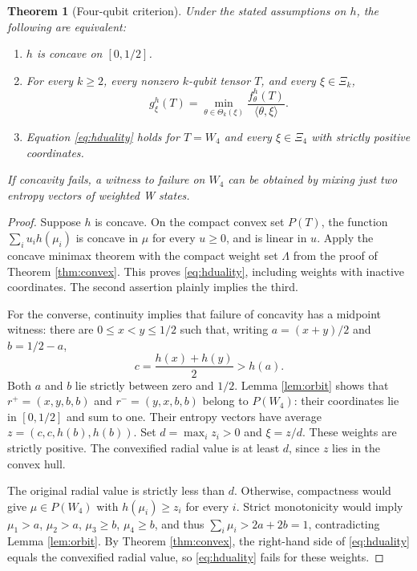 \documentclass[11pt,a4paper]{article}
\newtheorem{theorem}{Theorem}
\begin{document}
\begin{theorem}[Four-qubit criterion]\label{thm:criterion}
Under the stated assumptions on \(h\), the following are equivalent:
\begin{enumerate}
 \item \(h\) is concave on \([0,1/2]\).
 \item For every \(k\ge2\), every nonzero \(k\)-qubit tensor \(T\),
 and every \(\xi\in\Xi_k\),
 \begin{equation}
  g^h_\xi(T)=\min_{\theta\in\Theta_k(\xi)}
       \frac{f^h_\theta(T)}{\langle\theta,\xi\rangle}.
  \label{eq:hduality}
 \end{equation}
 \item Equation \eqref{eq:hduality} holds for \(T=W_4\) and every
 \(\xi\in\Xi_4\) with strictly positive coordinates.
\end{enumerate}
If concavity fails, a witness to failure on \(W_4\) can be obtained
by mixing just two entropy vectors of weighted W states.
\end{theorem}
\begin{proof}
Suppose \(h\) is concave. On the compact convex set \(P(T)\),
the function \(\sum_i u_i h(\mu_i)\) is concave in \(\mu\) for
every \(u\ge0\), and is linear in \(u\). Apply the concave minimax
theorem with the compact weight set \(\Lambda\) from the proof of
Theorem \ref{thm:convex}. This proves \eqref{eq:hduality}, including
weights with inactive coordinates. The second assertion plainly
implies the third.

For the converse, continuity implies that failure of concavity
has a midpoint witness: there are \(0\le x<y\le1/2\) such that,
writing \(a=(x+y)/2\) and \(b=1/2-a\),
\[
 c=\frac{h(x)+h(y)}2>h(a).
\]
Both \(a\) and \(b\) lie strictly between zero and \(1/2\).
Lemma \ref{lem:orbit} shows that
\(r^+=(x,y,b,b)\) and \(r^-=(y,x,b,b)\) belong to \(P(W_4)\):
their coordinates lie in \([0,1/2]\) and sum to one.
Their entropy vectors have average
\(z=(c,c,h(b),h(b))\). Set \(d=\max_i z_i>0\) and \(\xi=z/d\).
These weights are strictly positive. The convexified radial value
is at least \(d\), since \(z\) lies in the convex hull.

The original radial value is strictly less than \(d\).
Otherwise, compactness would give \(\mu\in P(W_4)\) with
\(h(\mu_i)\ge z_i\) for every \(i\). Strict monotonicity would imply
\(\mu_1>a\), \(\mu_2>a\), \(\mu_3\ge b\), \(\mu_4\ge b\),
and thus \(\sum_i\mu_i>2a+2b=1\), contradicting
Lemma \ref{lem:orbit}. By Theorem \ref{thm:convex}, the right-hand
side of \eqref{eq:hduality} equals the convexified radial value,
so \eqref{eq:hduality} fails for these weights.
\end{proof}
\end{document}

